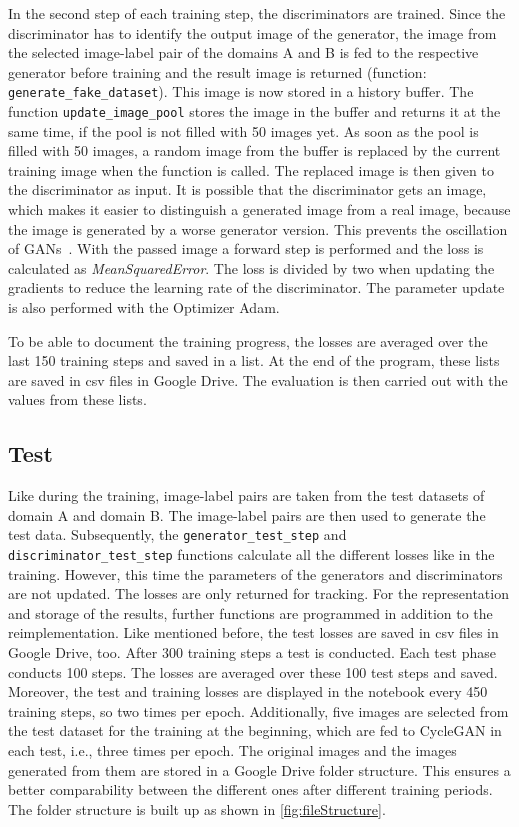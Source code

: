 \documentclass[fleqn,10pt]{SelfArx} %
\begin{document}
In the second step of each training step, the discriminators are trained. Since the discriminator has to identify the output image of the generator, the image from the selected image-label pair of the domains A and B is fed to the respective generator before training and the result image is returned (function: \texttt{generate\-\_fake\-\_data\-set}). This image is now stored in a history buffer. The function \texttt{update\_image\-\_pool} stores the image in the buffer and returns it at the same time, if the pool is not filled with 50 images yet. As soon as the pool is filled with 50 images, a random image from the buffer is replaced by the current training image when the function is called. The replaced image is then given to the discriminator as input. It is possible that the discriminator gets an image, which makes it easier to distinguish a generated image from a real image, because the image is generated by a worse generator version. This prevents the oscillation of \ac{GAN}s~\cite{oscillation}. With the passed image a forward step is performed and the loss is calculated as \textit{MeanSquaredError}. The loss is divided by two when updating the gradients to reduce the learning rate of the discriminator. The parameter update is also performed with the Optimizer Adam.~\cite{image-to-image-ccan, google-Adam, google-GradientTape}

To be able to document the training progress, the losses are averaged over the last 150 training steps and saved in a list. At the end of the program, these lists are saved in csv files in Google Drive. The evaluation is then carried out with the values from these lists.

\subsection{Test}
Like during the training, image-label pairs are taken from the test datasets of domain A and domain B. The image-label pairs are then used to generate the test data. Subsequently, the \texttt{generator\-\_test\-\_step} and \texttt{dis\-crimi\-nator\-\_test\-\_step} functions calculate all the different losses like in the training. However, this time the parameters of the generators and discriminators are not updated. The losses are only returned for tracking.
For the representation and storage of the results, further functions are programmed in addition to the reimplementation. Like mentioned before, the test losses are saved in csv files in Google Drive, too. After 300 training steps a test is conducted. Each test phase conducts 100 steps. The losses are averaged over these 100 test steps and saved. Moreover, the test and training losses are displayed in the notebook every 450 training steps, so two times per epoch. Additionally, five images are selected from the test dataset for the training at the beginning, which are fed to Cycle\ac{GAN} in each test, i.e., three times per epoch. The original images and the images generated from them are stored in a Google Drive folder structure. This ensures a better comparability between the different ones after different training periods. The folder structure is built up as shown in \autoref{fig:fileStructure}.
\end{document}
